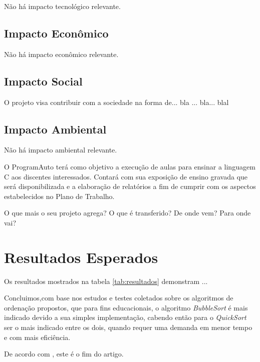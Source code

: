 \documentclass[a4paper,10pt]{article}  %
\begin{document}
Não há impacto tecnológico relevante.

\subsection{Impacto Econômico}

Não há impacto econômico relevante.

\subsection{Impacto Social}

O projeto visa contribuir com a sociedade na forma de... bla ... bla... blal

\subsection{Impacto Ambiental}

Não há impacto ambiental relevante.


O ProgramAuto terá como objetivo a execução de aulas para ensinar a linguagem C aos discentes interessados. Contará com sua exposição de ensino gravada que será disponibilizada e a elaboração de relatórios a fim de cumprir com os aspectos estabelecidos no Plano de Trabalho.



O que mais o seu projeto agrega? O que é transferido? De onde vem? Para onde vai?


\section{Resultados Esperados}

Os resultados mostrados na tabela \ref{tab:resultados} demonstram ...

    Concluimos,com base nos estudos e testes coletados sobre os algoritmos de ordenação propostos, que para fins educacionais, o algoritmo \textit{BubbleSort} é mais indicado devido a sua simples implementação, cabendo então para o \textit{QuickSort} ser o mais indicado entre os dois, quando requer uma demanda em menor tempo e com mais eficiência.

De acordo com \cite{Benante2008phd}, este é o fim do artigo.
\end{document}
